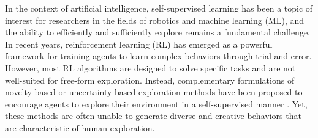 
In the context of artificial intelligence, self-supervised learning has been a topic of interest for researchers in the fields of robotics and machine learning (ML), and the ability to efficiently and sufficiently explore remains a fundamental challenge.
In recent years, reinforcement learning (RL) has emerged as a powerful framework for training agents to learn complex behaviors through trial and error.
However, most RL algorithms are designed to solve specific tasks and are not well-suited for free-form exploration.
Instead, complementary formulations of novelty-based or uncertainty-based exploration methods have been proposed to encourage agents to explore their environment in a self-supervised manner \citep{rnd,icm,disagreement,exploration_survey}. 
Yet, these methods are often unable to generate diverse and creative behaviors that are characteristic of human exploration.





